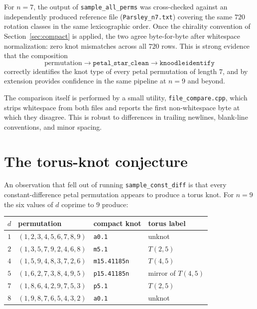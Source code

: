 \documentclass[11pt,oneside]{report}
\theoremstyle{definition}
\begin{document}
For $n = 7$, the output of \texttt{sample\_all\_perms} was cross-checked
against an independently produced reference file
(\texttt{Parsley\_n7.txt}) covering the same $720$ rotation classes in
the same lexicographic order. Once the chirality convention of
Section~\ref{sec:compact} is applied, the two agree byte-for-byte after
whitespace normalization: zero knot mismatches across all $720$ rows.
This is strong evidence that the composition
\[
\text{permutation} \longrightarrow
\texttt{petal\_star\_clean} \longrightarrow
\texttt{knoodleidentify}
\]
correctly identifies the knot type of every petal permutation of length
$7$, and by extension provides confidence in the same pipeline at
$n = 9$ and beyond.

The comparison itself is performed by a small utility,
\texttt{file\_compare.cpp}, which strips whitespace from both files and
reports the first non-whitespace byte at which they disagree. This is
robust to differences in trailing newlines, blank-line conventions, and
minor spacing.

\section{The torus-knot conjecture}\label{sec:torus-conj}

An observation that fell out of running \texttt{sample\_const\_diff} is
that every constant-difference petal permutation appears to produce a
torus knot. For $n = 9$ the six values of $d$ coprime to $9$ produce:

\begin{center}
\begin{tabular}{@{}rlll@{}}
\hline
$d$ & permutation & compact knot & torus label \\
\hline
$1$ & $(1,2,3,4,5,6,7,8,9)$ & \texttt{a0.1}       & unknot        \\
$2$ & $(1,3,5,7,9,2,4,6,8)$ & \texttt{m5.1}       & $T(2,5)$      \\
$4$ & $(1,5,9,4,8,3,7,2,6)$ & \texttt{m15.41185n} & $T(4,5)$      \\
$5$ & $(1,6,2,7,3,8,4,9,5)$ & \texttt{p15.41185n} & mirror of $T(4,5)$ \\
$7$ & $(1,8,6,4,2,9,7,5,3)$ & \texttt{p5.1}       & $T(2,5)$      \\
$8$ & $(1,9,8,7,6,5,4,3,2)$ & \texttt{a0.1}       & unknot        \\
\hline
\end{tabular}
\end{center}
\end{document}
